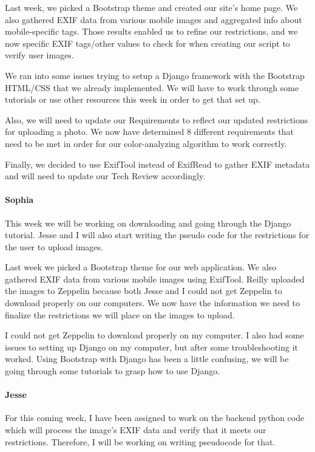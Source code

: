 \documentclass[onecolumn, draftclsnofoot,10pt, compsoc]{IEEEtran}
\begin{document}
\begin{flushleft}
 
Last week, we picked a Bootstrap theme and created our site's home page. We also gathered EXIF data from various mobile images and aggregated info about mobile-specific tags. Those results enabled us to refine our restrictions, and we now specific EXIF tags/other values to check for when creating our script to verify user images.
 
 
We ran into some issues trying to setup a Django framework with the Bootstrap HTML/CSS that we already implemented. We will have to work through some tutorials or use other resources this week in order to get that set up.
 
Also, we will need to update our Requirements to reflect our updated restrictions for uploading a photo. We now have determined 8 different requirements that need to be met in order for our color-analyzing algorithm to work correctly.
 
Finally, we decided to use ExifTool instead of ExifRead to gather EXIF metadata and will need to update our Tech Review accordingly.
 
\paragraph{Sophia}
 
This week we will be working on downloading and going through the Django tutorial. Jesse and I will also start writing the pseudo code for the restrictions for the user to upload images.
 
 
Last week we picked a Bootstrap theme for our web application. We also gathered EXIF data from various mobile images using ExifTool. Reilly uploaded the images to Zeppelin because both Jesse and I could not get Zeppelin to download properly on our computers. We now have the information we need to finalize the restrictions we will place on the images to upload.
 
 
I could not get Zeppelin to download properly on my computer. I also had some issues to setting up Django on my computer, but after some troubleshooting it worked. Using Bootstrap with Django has been a little confusing, we will be going through some tutorials to grasp how to use Django.
 
\paragraph{Jesse}
 
For this coming week, I have been assigned to work on the backend python code which will process the image's EXIF data and verify that it meets our restrictions. Therefore, I will be working on writing pseudocode for that.
 

\end{flushleft}
\end{document}

